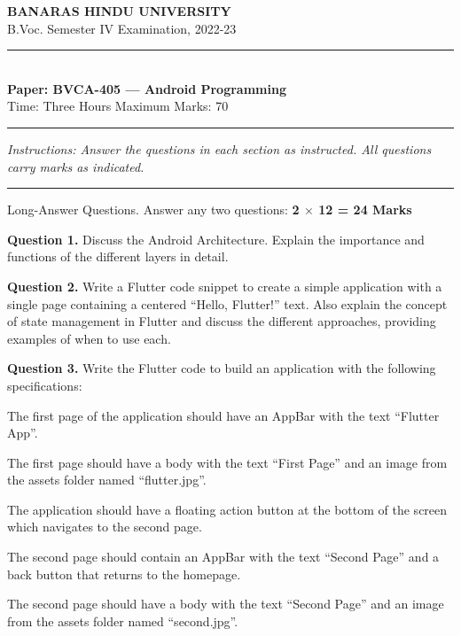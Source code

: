 \documentclass[11pt,a4paper]{article}
\begin{document}
\begin{center}
  {\large\bfseries BANARAS HINDU UNIVERSITY}\\[2pt]
  {
\normalsize B.Voc. Semester IV Examination, 2022-23}\\[6pt]
  \rule{0.8\linewidth}{0.5pt}\\[6pt]
  {\large\bfseries Paper: BVCA-405 --- Android Programming}\\[4pt]
  {
\normalsize Time: Three Hours \hfill Maximum Marks: 70}
\end{center}

\rule{\linewidth}{0.4pt}

\smallskip



\noindent   \textit{Instructions: Answer the questions in each section as instructed. All questions carry marks as indicated.}

\bigskip




\rule{\linewidth}{0.4pt}\smallskip

Long-Answer Questions. Answer any two questions: \hfill   \textbf{2 $ \times$ 12 = 24 Marks}

\medskip



\noindent   \textbf{Question 1.} Discuss the Android Architecture. Explain the importance and functions of the different layers in detail.

\medskip



\noindent   \textbf{Question 2.} Write a Flutter code snippet to create a simple application with a single page containing a centered ``Hello, Flutter!'' text. Also explain the concept of state management in Flutter and discuss the different approaches, providing examples of when to use each.

\medskip



\noindent   \textbf{Question 3.} Write the Flutter code to build an application with the following specifications:

\begin{parts}
  \item The first page of the application should have an AppBar with the text ``Flutter App''.
  \item The first page should have a body with the text ``First Page'' and an image from the assets folder named ``flutter.jpg''.
  \item The application should have a floating action button at the bottom of the screen which navigates to the second page.
  \item The second page should contain an AppBar with the text ``Second Page'' and a back button that returns to the homepage.
  \item The second page should have a body with the text ``Second Page'' and an image from the assets folder named ``second.jpg''.
\end{parts}
\end{document}
